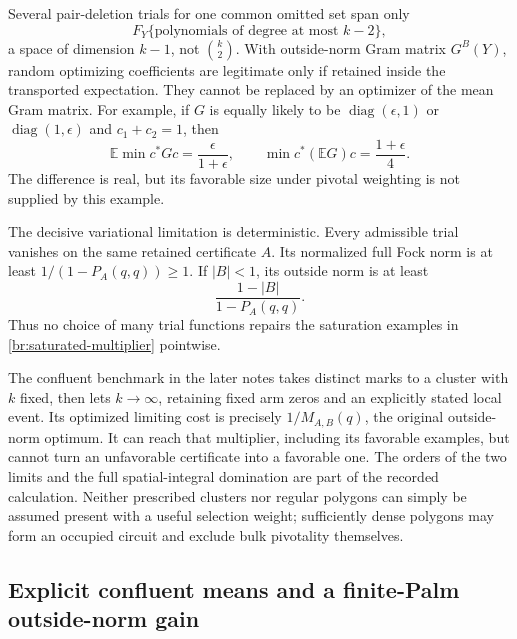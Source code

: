 \documentclass[11pt,a4paper]{article}
\theoremstyle{definition}
\theoremstyle{remark}
\numberwithin{equation}{section}
\begin{document}
Several pair-deletion trials for one common omitted set span only
\[
 F_Y\{\text{polynomials of degree at most }k-2\},
\]
a space of dimension $k-1$, not $\binom{k}{2}$.  With outside-norm
Gram matrix $G^B(Y)$, random optimizing coefficients are legitimate
only if retained inside the transported expectation.  They cannot be
replaced by an optimizer of the mean Gram matrix.  For example, if
$G$ is equally likely to be
$\operatorname{diag}(\epsilon,1)$ or
$\operatorname{diag}(1,\epsilon)$ and $c_1+c_2=1$, then
\[
 \mathbb E\min c^*Gc=\frac{\epsilon}{1+\epsilon},
 \qquad
 \min c^*(\mathbb EG)c=\frac{1+\epsilon}{4}.
\]
The difference is real, but its favorable size under pivotal weighting
is not supplied by this example.

The decisive variational limitation is deterministic.  Every admissible
trial vanishes on the same retained certificate $A$.  Its normalized
full Fock norm is at least $1/(1-P_A(q,q))\geq1$.  If $|B|<1$, its
outside norm is at least
\[
 \frac{1-|B|}{1-P_A(q,q)}.
\]
Thus no choice of many trial functions repairs the saturation examples
in \eqref{br:saturated-multiplier} pointwise.

The confluent benchmark in the later notes takes distinct marks to a
cluster with $k$ fixed, then lets $k\to\infty$, retaining fixed arm
zeros and an explicitly stated local event.  Its optimized limiting
cost is precisely $1/M_{A,B}(q)$, the original outside-norm optimum.
It can reach that multiplier, including its favorable examples, but
cannot turn an unfavorable certificate into a favorable one.  The
orders of the two limits and the full spatial-integral domination
are part of the recorded calculation.  Neither prescribed clusters
nor regular polygons can simply be assumed present with a useful
selection weight; sufficiently dense polygons may form an occupied
circuit and exclude bulk pivotality themselves.

\subsection{Explicit confluent means and a finite-Palm outside-norm gain}
\label{br:confluent-explicit}
\end{document}
